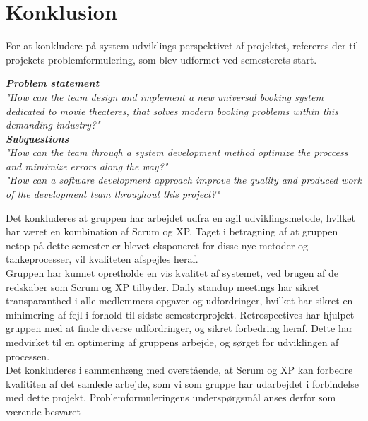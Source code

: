 \chapter{Konklusion}\label{ch:konklusion}
For at konkludere på system udviklings perspektivet af projektet, refereres der til projekets problemformulering,
som blev udformet ved semesterets start.

\begin{center}
\textit{\textbf{Problem statement} \\
"How can the team design and implement a new universal booking system dedicated to movie theateres, 
that solves modern booking problems within this demanding industry?"} \\

\textit{\textbf{Subquestions}\\
"How can the team through a system development method optimize the proccess and mimimize errors along the way?"}\\

\textit{"How can a software development approach improve the quality and 
produced work of the development team throughout this project?"}\\
\end{center} 

Det konkluderes at gruppen har arbejdet udfra en agil udviklingsmetode, hvilket har været en kombination af Scrum og XP.
Taget i betragning af at gruppen netop på dette semester er blevet eksponeret for disse nye metoder og tankeprocesser,
vil kvaliteten afspejles heraf. \\

Gruppen har kunnet opretholde en vis kvalitet af systemet, ved brugen af de redskaber som Scrum og XP tilbyder.
Daily standup meetings har sikret transparanthed i alle medlemmers opgaver og udfordringer, hvilket har sikret
en minimering af fejl i forhold til sidste semesterprojekt. 
Retrospectives har hjulpet gruppen med at finde diverse udfordringer, og sikret forbedring heraf. Dette har medvirket
til en optimering af gruppens arbejde, og sørget for udviklingen af processen. \\

Det konkluderes i sammenhæng med overstående, at Scrum og XP kan forbedre kvalititen af det samlede arbejde, 
som vi som gruppe har udarbejdet i forbindelse med dette projekt. Problemformuleringens underspørgsmål anses derfor
som værende besvaret